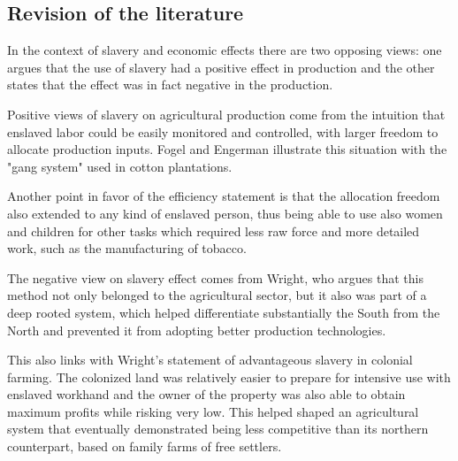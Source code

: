 \documentclass[11pt]{beamer}
\begin{document}
\subsection{Revision of the literature}
\begin{frame}
In the context of slavery and economic effects there are two opposing views: one argues that the use of slavery had a positive effect in production and the other states that the effect was in fact negative in the production.
\end{frame}

\begin{frame}
Positive views of slavery on agricultural production come from the intuition that enslaved labor could be easily monitored and controlled, with larger freedom to allocate production inputs. Fogel and Engerman illustrate this situation with the "gang system" used in cotton plantations.

\vspace{\baselineskip}
Another point in favor of the efficiency statement is that the allocation freedom also extended to any kind of enslaved person, thus being able to use also women and children for other tasks which required less raw force and more detailed work, such as the manufacturing of tobacco.
\end{frame}

\begin{frame}
The negative view on slavery effect comes from Wright, who argues that this method not only belonged to the agricultural sector, but it also was part of a deep rooted system, which helped differentiate substantially the South from the North and prevented it from adopting better production technologies.

\vspace{\baselineskip}
This also links with Wright's statement of advantageous slavery in colonial farming. The colonized land was relatively easier to prepare for intensive use with enslaved workhand and the owner of the property was also able to obtain maximum profits while risking very low. This helped shaped an agricultural system that eventually demonstrated being less competitive than its northern counterpart, based on family farms of free settlers.
\end{frame}

\end{document}
